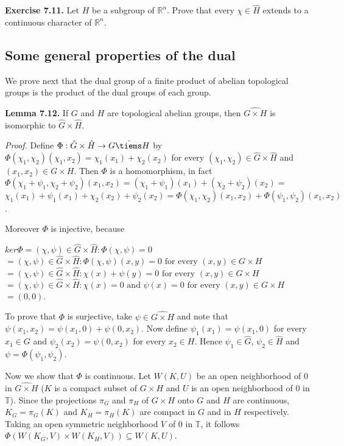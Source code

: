 \documentclass[12pt]{article}
\begin{document}
\textbf{Exercise 7.11.} Let $H$ be a subgroup of $\mathbb{R}^n$. Prove that every $\chi \in \hat{H}$ extends to a continuous character of $\mathbb{R}^n$.


\subsection{Some general properties of the dual}
We prove next that the dual group of a finite product of abelian topological groups is the product of the dual
groups of each group.


\textbf{Lemma 7.12.} If $G$ and $H$ are topological abelian groups, then $\hat{G \times H}$ is isomorphic to $\hat{G} \times \hat{H}$.


\emph{Proof.} Define $\Phi : \hat{G} \times \hat{H} \to \hat{G \tiems H}$ by $\Phi(\chi_1, \chi_2)(\chi_1, x_2) = \chi_1(x_1) + \chi_2(x_2)$ for every $(\chi_1, \chi_2) \in \hat{G} \times \hat{H}$ and
$(x_1, x_2) \in G \times H$. Then $\Phi$ is a homomorphism, in fact $\Phi(\chi_1+\psi_1, \chi_2+\psi_2)(x_1, x_2) = (\chi_1+\psi_1)(x_1)+(\chi_2+\psi_2)(x_2) =$
$\chi_1 (x_1) + \psi_1 (x_1) + \chi_2 (x_2) + \psi_2 (x_2) = \Phi (\chi_1, \chi_2)(x_1, x_2) + \Phi (\psi_1, \psi_2)(x_1, x_2)$.


    Moreover $\Phi$ is injective, because


        $ker \Phi = {(\chi, \psi) \in \hat{G} \times \hat{H} : \Phi (\chi, \psi) = 0}$ 
            $ = {(\chi, \psi) \in \hat{G} \times \hat{H} : \Phi (\chi, \psi)(x, y) = 0 \text{ for every } (x, y) \in G \times H}$
            $ = {(\chi, \psi) \in \hat{G} \times \hat{H} : \chi(x) + \psi(y) = 0 \text{ for every } (x, y) \in G \times H}$
            $ = {(\chi, \psi) \in \hat{G} \times \hat{H} : \chi(x) = 0 \text{ and } \psi(x) = 0 \text{ for every } (x, y) \in G \times H}$
            $ = {(0, 0)}$.


    To prove that $\Phi$ is surjective, take $\psi \in \hat{G \times H}$ and note that $\psi(x_1, x_2) = \psi(x_1, 0) + \psi(0, x_2)$. Now define
$\psi_1(x_1) = \psi(x_1, 0)$ for every $x_1 \in G$ and $\psi_2(x_2) = \psi(0, x_2)$ for every $x_2 \in H$. Hence $\psi_1 \in \hat{G}$, $\psi_2 \in \hat{H}$ and
$\psi = \Phi(\psi_1, \psi_2)$.


    Now we show that $\Phi$ is continuous. Let $W(K, U)$ be an open neighborhood of $0$ in $\hat{G \times H}$ ($K$ is a compact
subset of $G \times H$ and $U$ is an open neighborhood of 0 in $\mathbb{T}$). Since the projections $\pi_G$ and $\pi_H$ of $G \times H$ onto
$G$ and $H$ are continuous, $K_G = \pi_G (K)$ and $K_H = \pi_H (K)$ are compact in $G$ and in $H$ respectively. Taking an
open symmetric neighborhood $V$ of 0 in $\mathbb{T}$, it follows $\Phi(W(K_G, V ) \times W(K_H, V )) \subseteq W(K, U)$.
\end{document}
